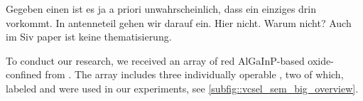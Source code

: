 
	\begin{remark}
		 Gegeben einen \nd ist es ja a priori unwahrscheinlich, dass ein einziges \siv drin vorkommt. In antenneteil gehen wir darauf ein. Hier nicht. Warum nicht? Auch im Siv paper ist keine thematisierung.
	\end{remark}

	To conduct our research, we received an array of red AlGaInP-based oxide-confined \VCSELs from \michler. The array includes three individually operable \VCSELs, two of which, labeled \BmFour and \BmTwo were used in our experiments, see \autoref{subfig::vcsel_sem_big_overview}.

